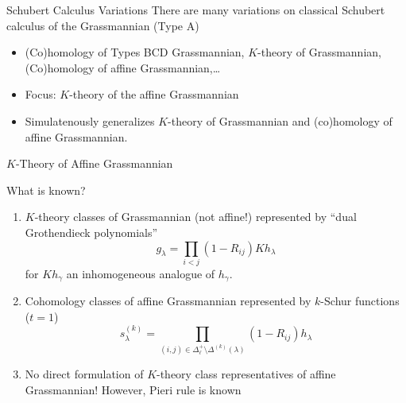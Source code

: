 \documentclass{beamer}
\begin{document}
\begin{frame}{Schubert Calculus Variations}
  There are many variations on classical Schubert calculus of the
  Grassmannian (Type A)
  \begin{itemize}
  \item (Co)homology of Types BCD Grassmannian, \(K\)-theory of
    Grassmannian, (Co)homology of affine Grassmannian,\ldots \pause
  \item Focus: \(K\)-theory of the affine Grassmannian \pause
  \item Simulatenously generalizes \(K\)-theory of Grassmannian and
    (co)homology of affine Grassmannian.
  \end{itemize}
\end{frame}
\begin{frame}{\(K\)-Theory of Affine Grassmannian}
  \begin{block}{What is known?}
    \begin{enumerate}
    \item \(K\)-theory classes of Grassmannian (not affine!)
      represented by
      ``dual Grothendieck 
      polynomials'' \[
        g_\lambda = \prod_{i < j} (1-R_{ij}) Kh_\lambda
      \]
      for \(Kh_\gamma\) an inhomogeneous analogue of \(h_\gamma\).\pause
    \item Cohomology classes of affine Grassmannian represented by
      \(k\)-Schur functions (\(t=1\)) \[
        s_\lambda^{(k)} = \prod_{(i,j) \in \Delta^+_\ell \setminus
          \Delta^{(k)}(\lambda)} (1-R_{ij}) h_\lambda
      \] \pause
    \item No direct formulation of \(K\)-theory class representatives of affine 
      Grassmannian! However, Pieri rule is known~\cite{morse}
    \end{enumerate}
  \end{block}
\end{frame}
\end{document}
